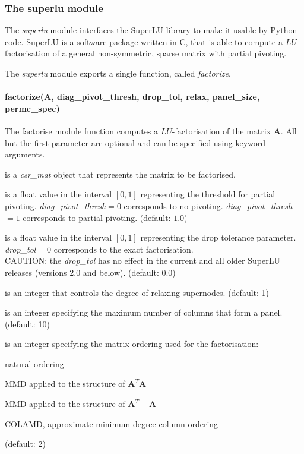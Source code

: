 \documentclass[a4paper]{article}
\newcommand{\mat}[1]{\ensuremath{\boldsymbol{#1}}}
\newenvironment{arglist} {\begin{list}{}{\setlength{\leftmargin}{4em}\setlength{\itemsep}{0cm}\setlength{\labelwidth}{3em}}}
  {\end{list}}
\begin{document}
\subsubsection{The superlu module}
%
The \textit{superlu} module interfaces the SuperLU library to make it
usable by Python code. SuperLU is a software package written in C,
that is able to compute a $LU$-factorisation of a general
non-symmetric, sparse matrix with partial pivoting.

The \textit{superlu} module exports a single function, called
\textit{factorize}.

\paragraph{factorize(A, diag\_pivot\_thresh, drop\_tol, relax, panel\_size, permc\_spec)}
%
The factorise module function computes a $LU$-factorisation of the
matrix $\mat{A}$. All but the first parameter are optional and can be
specified using keyword arguments.
\begin{arglist}
\item[$\mat{A}$] is a \textit{csr\_mat} object that represents the
  matrix to be factorised.
\item[\textit{diag\_pivot\_thresh}] is a float value in the interval
  $[0,1]$ representing the threshold for partial pivoting.
  \textit{diag\_pivot\_thresh}${}=0$ corresponds to no pivoting.
  \textit{diag\_pivot\_thresh}${}=1$ corresponds to partial pivoting.
  (default: $1.0$)
\item[\textit{drop\_tol}] is a float value in the interval $[0,1]$
  representing the drop tolerance parameter.  \textit{drop\_tol}${}=0$
  corresponds to the exact factorisation. \\
  CAUTION: the \textit{drop\_tol} has no effect in the current and all
  older SuperLU releases (versions 2.0 and below). (default: 0.0)
\item[\textit{relax}] is an integer that controls the degree of
  relaxing supernodes. (default: 1)
\item[\textit{panel\_size}] is an integer specifying the maximum number
  of columns that form a panel. (default: 10)
\item[\textit{permc\_spec}] is an integer specifying the matrix
  ordering used for the factorisation:
  \begin{list}{}{}
  \item[0] natural ordering
  \item[1] MMD applied to the structure of $\mat{A}^T\mat{A}$
  \item[2] MMD applied to the structure of $\mat{A}^T + \mat{A}$
  \item[3] COLAMD, approximate minimum degree column ordering
  \end{list}
  (default: 2)
\end{arglist}
\end{document}
